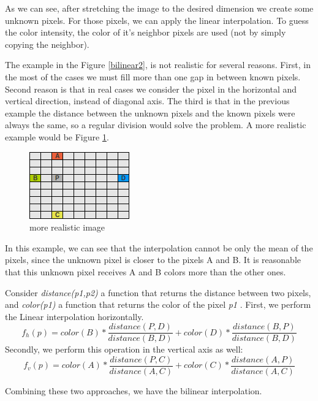 \documentclass{article}
\begin{document}
	As we can see, after stretching the image to the desired dimension we create some unknown pixels. For those pixels, we can apply the linear interpolation. To guess the color intensity, the color of it's neighbor pixels are used (not by simply copying the neighbor).

	The example in the Figure \ref{bilinear2}, is not realistic for several reasons. First, in the most of the cases we must fill more than one gap in between known pixels. Second reason is that in real cases we consider the pixel in the horizontal and vertical direction, instead of diagonal axis. The third is that in the 
	previous example the distance between the unknown pixels and the known pixels were always the same, so a regular division would solve the problem. 
A more realistic example would be Figure \ref{bilinear3}.
	
	\begin{figure} [H]
		\centering
		\includegraphics[scale=1]{images/bilinear_interpolation_3}
		\caption{more realistic image\label{bilinear3}}
	\end{figure}
	
	In this example, we can see that the interpolation cannot be only the mean of the pixels, since the unknown pixel 
	is closer to the pixels A and B. It is reasonable that this unknown pixel receives A and B colors more than the other ones.

	Consider \textit{distance(p1,p2)} a function that returns the distance between two pixels, 
	and \textit{color(p1)} a function that returns the color of the pixel \textit{p1} . First, we perform the Linear interpolation horizontally.
	\begin{equation}
	 f_h(p)=color(B)*\frac{distance(P,D)}{distance(B,D)}+color(D)*\frac{distance(B,P)}{distance(B,D)}  
	\end{equation}
	Secondly, we perform this operation in the vertical axis as well:
	\begin{equation}
	 f_v(p)=color(A)*\frac{distance(P,C)}{distance(A,C)}+color(C)*\frac{distance(A,P)}{distance(A,C)}
	\end{equation}

	Combining these two approaches, we have the bilinear interpolation.
\end{document}
